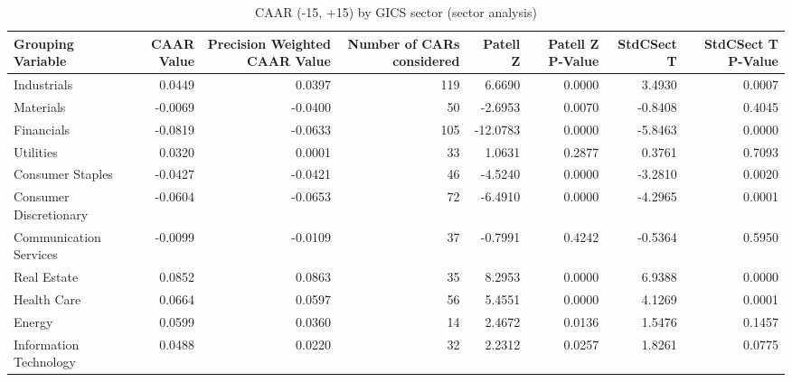 \begin{table}
\caption{CAAR (-15, +15) by GICS sector (sector analysis)}
\label{tab:sector_caar}
\begin{tabular}{lrrrrrrr}
\toprule
Grouping Variable & CAAR Value & Precision Weighted CAAR Value & Number of CARs considered & Patell Z & Patell Z P-Value & StdCSect T & StdCSect T P-Value \\
\midrule
Industrials & 0.0449 & 0.0397 & 119 & 6.6690 & 0.0000 & 3.4930 & 0.0007 \\
Materials & -0.0069 & -0.0400 & 50 & -2.6953 & 0.0070 & -0.8408 & 0.4045 \\
Financials & -0.0819 & -0.0633 & 105 & -12.0783 & 0.0000 & -5.8463 & 0.0000 \\
Utilities & 0.0320 & 0.0001 & 33 & 1.0631 & 0.2877 & 0.3761 & 0.7093 \\
Consumer Staples & -0.0427 & -0.0421 & 46 & -4.5240 & 0.0000 & -3.2810 & 0.0020 \\
Consumer Discretionary & -0.0604 & -0.0653 & 72 & -6.4910 & 0.0000 & -4.2965 & 0.0001 \\
Communication Services & -0.0099 & -0.0109 & 37 & -0.7991 & 0.4242 & -0.5364 & 0.5950 \\
Real Estate & 0.0852 & 0.0863 & 35 & 8.2953 & 0.0000 & 6.9388 & 0.0000 \\
Health Care & 0.0664 & 0.0597 & 56 & 5.4551 & 0.0000 & 4.1269 & 0.0001 \\
Energy & 0.0599 & 0.0360 & 14 & 2.4672 & 0.0136 & 1.5476 & 0.1457 \\
Information Technology & 0.0488 & 0.0220 & 32 & 2.2312 & 0.0257 & 1.8261 & 0.0775 \\
\bottomrule
\end{tabular}
\end{table}
